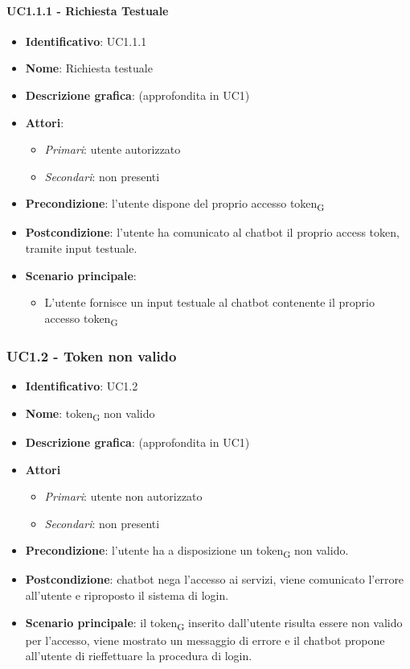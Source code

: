 \paragraph{UC1.1.1 - Richiesta Testuale}
\begin{itemize}
   \item \textbf{Identificativo}: UC1.1.1
   \item \textbf{Nome}: Richiesta testuale
   \item \textbf{Descrizione grafica}: (approfondita in UC1)
   \item \textbf{Attori}:
   \begin{itemize} 
       \item \textit{Primari}: utente autorizzato
       \item \textit{Secondari}: non presenti
   \end{itemize}
       \item \textbf{Precondizione}: l'utente dispone del proprio accesso token\textsubscript{G}
       \item \textbf{Postcondizione}: l'utente ha comunicato al chatbot il proprio access token, tramite input testuale. 
    \item \textbf{Scenario principale}: 
       \begin{itemize}
           \item L'utente fornisce un input testuale al chatbot contenente il proprio accesso token\textsubscript{G} 
       \end{itemize}
\end{itemize}

\subsubsection{UC1.2 - Token non valido}
\begin{itemize}
    \item \textbf{Identificativo}: UC1.2
    \item \textbf{Nome}: token\textsubscript{G} non valido
    \item \textbf{Descrizione grafica}: (approfondita in UC1)
    \item \textbf{Attori}
 \begin{itemize} 
    \item \textit{Primari}: utente non autorizzato 
    \item \textit{Secondari}: non presenti
 \end{itemize}
 \item \textbf{Precondizione}: l'utente ha a disposizione un token\textsubscript{G} non valido.
 \item \textbf{Postcondizione}: chatbot nega l'accesso ai servizi, viene comunicato l'errore all'utente e riproposto il sistema di login.
 \item \textbf{Scenario principale}: il token\textsubscript{G} inserito dall'utente risulta essere non valido per l'accesso, viene mostrato un messaggio di errore e il chatbot propone all'utente di rieffettuare la procedura di login.
\end{itemize}
\newpage
